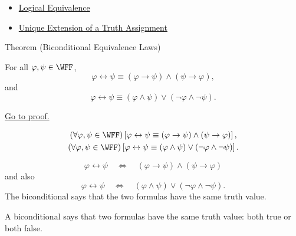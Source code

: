 \begin{dependencies}
\begin{itemize}
  \item \hyperref[def:logical-equivalence-propositional-logic]{Logical Equivalence}
  \item \hyperref[thm:unique-extension-truth-assignment-propositional-logic]{Unique Extension of a Truth Assignment}
\end{itemize}
\end{dependencies}
\begin{theorembox}{Theorem (Biconditional Equivalence Laws)}
\begin{theorem}
\label{thm:biconditional-equivalence-laws-propositional-logic}
For all \(\varphi,\psi\in\WFF\),
\[
\varphi\leftrightarrow\psi
\equiv
(\varphi\to\psi)\land(\psi\to\varphi),
\]
and
\[
\varphi\leftrightarrow\psi
\equiv
(\varphi\land\psi)\lor(\neg\varphi\land\neg\psi).
\]

\noindent\hyperref[prf:biconditional-equivalence-laws-propositional-logic]{Go to proof.}
\end{theorem}
\end{theorembox}

\begin{remark*}
\[
\begin{gathered}
(\forall\varphi,\psi\in\WFF)
\left[
\varphi\leftrightarrow\psi
\equiv
(\varphi\to\psi)\land(\psi\to\varphi)
\right],\\
(\forall\varphi,\psi\in\WFF)
\left[
\varphi\leftrightarrow\psi
\equiv
(\varphi\land\psi)\lor(\neg\varphi\land\neg\psi)
\right].
\end{gathered}
\]
\end{remark*}

\begin{remark*}
\[
\varphi\leftrightarrow\psi
\quad\Longleftrightarrow\quad
(\varphi\to\psi)\land(\psi\to\varphi)
\]
and also
\[
\varphi\leftrightarrow\psi
\quad\Longleftrightarrow\quad
(\varphi\land\psi)\lor(\neg\varphi\land\neg\psi).
\]
The biconditional says that the two formulas have the same truth value.
\end{remark*}

\begin{remark*}[Interpretation]
A biconditional says that two formulas have the same truth value: both true or both false.
\end{remark*}

